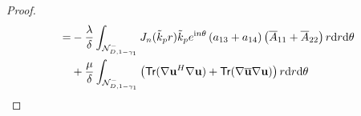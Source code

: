 \documentclass[11pt,reqno,twoside]{amsart}
\theoremstyle{definition}
\theoremstyle{remark}
\numberwithin{equation}{section}
\newcommand{\bx}{\mathbf{x}}
\begin{document}
\begin{proof}
\begin{align}
					=&-\frac{\lambda }{\delta } \int_{\mathcal{N}_{D,1-\gamma_{1}}^{-}}J_n(\tilde{k}_{p} r)\tilde{k}_{p} e^{\mathrm{i}n\theta }\left(a_{13}+a_{14} \right)\left(\overline{A}_{11}+ \overline{A}_{22}\right)r\mathrm{d}r\mathrm{d}\theta\notag\\
					&+\frac{\mu }{\delta } \int_{\mathcal{N}_{D,1-\gamma_{1}}^{-}}\left({\sf Tr}(\nabla\mathbf{u}^{H} \nabla\mathbf{u})+{\sf Tr}(\nabla\overline{\mathbf{u}}\nabla{\mathbf{u}})\right)r\mathrm{d}r\mathrm{d}\theta\notag\\

\end{align}
\end{proof}
\end{document}
